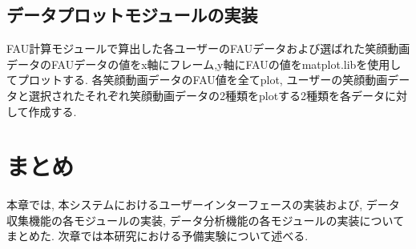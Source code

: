 \subsection{データプロットモジュールの実装}
FAU計算モジュールで算出した各ユーザーのFAUデータおよび選ばれた笑顔動画データのFAUデータの値をx軸にフレーム,y軸にFAUの値をmatplot.libを使用してプロットする.
各笑顔動画データのFAU値を全てplot, ユーザーの笑顔動画データと選択されたそれぞれ笑顔動画データの2種類をplotする2種類を各データに対して作成する.

\section{まとめ}
本章では, 本システムにおけるユーザーインターフェースの実装および, データ収集機能の各モジュールの実装,
データ分析機能の各モジュールの実装についてまとめた.
次章では本研究における予備実験について述べる.
